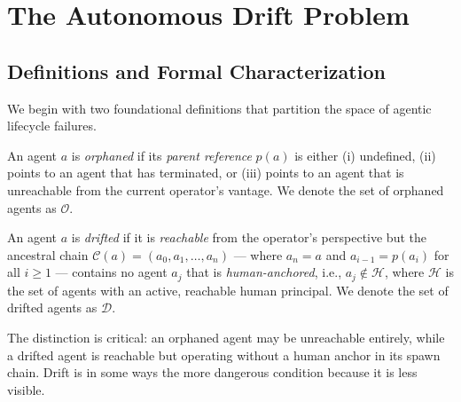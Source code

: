 \section{The Autonomous Drift Problem}

\subsection{Definitions and Formal Characterization}

We begin with two foundational definitions that partition the space of agentic lifecycle failures.

\begin{definition}
An agent $a$ is \textit{orphaned} if its \textit{parent reference} $p(a)$ is either (i) undefined, (ii) points to an agent that has terminated, or (iii) points to an agent that is unreachable from the current operator's vantage. We denote the set of orphaned agents as $\mathcal{O}$.
\end{definition}

\begin{definition}
An agent $a$ is \textit{drifted} if it is \textit{reachable} from the operator's perspective but the ancestral chain $\mathcal{C}(a) = (a_0, a_1, \ldots, a_n)$ — where $a_n = a$ and $a_{i-1} = p(a_i)$ for all $i \geq 1$ — contains no agent $a_j$ that is \textit{human-anchored}, i.e., $a_j \notin \mathcal{H}$, where $\mathcal{H}$ is the set of agents with an active, reachable human principal. We denote the set of drifted agents as $\mathcal{D}$.
\end{definition}

The distinction is critical: an orphaned agent may be unreachable entirely, while a drifted agent is reachable but operating without a human anchor in its spawn chain. Drift is in some ways the more dangerous condition because it is less visible.

